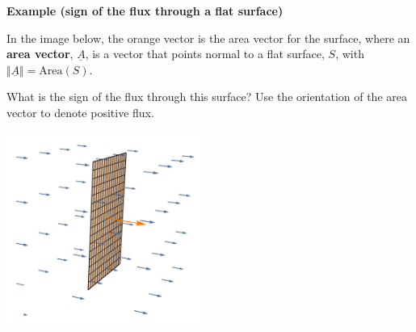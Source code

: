 \documentclass[12pt,letterpaper,noanswers]{exam}
\newcommand{\mb}[1]{\underline{#1}}
\begin{document}

\noindent\textbf{Example (sign of the flux through a flat surface)}

In the image below, the orange vector is the area vector for the surface, where an \textbf{area vector}, $\mb A$, is a vector that points normal to a flat surface, $S$, with $\Vert \mb A \Vert = \text{Area}(S)$.


What is the sign of the flux through this surface?  Use the orientation of the area vector to denote positive flux.


\includegraphics[width=2.5in]{img/C29p3-18.png}
\end{document}
